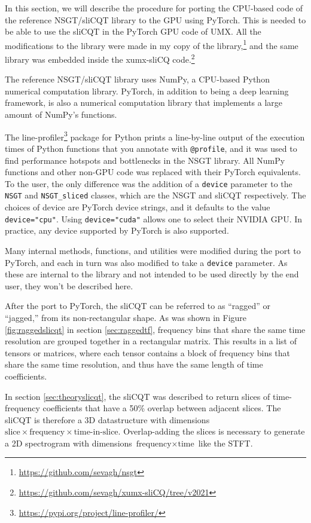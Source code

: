 \documentclass[report.tex]{subfiles}
\begin{document}
In this section, we will describe the procedure for porting the CPU-based code of the reference NSGT/sliCQT library to the GPU using PyTorch. This is needed to be able to use the sliCQT in the PyTorch GPU code of UMX. All the modifications to the library were made in my copy of the library,\footnote{\url{https://github.com/sevagh/nsgt}} and the same library was embedded inside the xumx-sliCQ code.\footnote{\url{https://github.com/sevagh/xumx-sliCQ/tree/v2021}}

The reference NSGT/sliCQT library uses NumPy, a CPU-based Python numerical computation library. PyTorch, in addition to being a deep learning framework, is also a numerical computation library that implements a large amount of NumPy's functions.

The line-profiler\footnote{\url{https://pypi.org/project/line-profiler/}} package for Python prints a line-by-line output of the execution times of Python functions that you annotate with \Verb#@profile#, and it was used to find performance hotspots and bottlenecks in the NSGT library. All NumPy functions and other non-GPU code was replaced with their PyTorch equivalents. To the user, the only difference was the addition of a \Verb#device# parameter to the \Verb#NSGT# and \Verb#NSGT_sliced# classes, which are the NSGT and sliCQT respectively. The choices of device are PyTorch device strings, and it defaults to the value \Verb#device="cpu"#. Using \Verb#device="cuda"# allows one to select their NVIDIA GPU. In practice, any device supported by PyTorch is also supported.

Many internal methods, functions, and utilities were modified during the port to PyTorch, and each in turn was also modified to take a \Verb#device# parameter. As these are internal to the library and not intended to be used directly by the end user, they won't be described here.

After the port to PyTorch, the sliCQT can be referred to as ``ragged'' or ``jagged,'' from its non-rectangular shape. As was shown in Figure \ref{fig:raggedslicqt} in section \ref{sec:raggedtf}, frequency bins that share the same time resolution are grouped together in a rectangular matrix. This results in a list of tensors or matrices, where each tensor contains a block of frequency bins that share the same time resolution, and thus have the same length of time coefficients.

In section \ref{sec:theoryslicqt}, the sliCQT was described to return slices of time-frequency coefficients that have a 50\% overlap between adjacent slices. The sliCQT is therefore a 3D datastructure with dimensions $\text{slice} \times \text{frequency} \times \text{time-in-slice}$. Overlap-adding the slices is necessary to generate a 2D spectrogram with dimensions $\text{frequency} \times \text{time}$ like the STFT.
\end{document}
